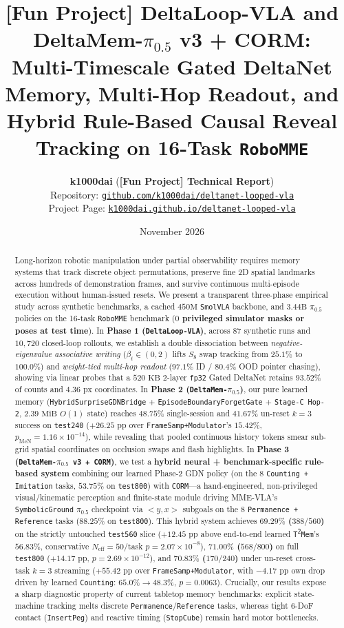 \documentclass[10pt]{article}
\title{\textbf{[Fun Project] DeltaLoop-VLA and DeltaMem-$\pi_{0.5}$ v3 + CORM:\\Multi-Timescale Gated DeltaNet Memory, Multi-Hop Readout, and Hybrid Rule-Based Causal Reveal Tracking on 16-Task \texttt{RoboMME}}}
\author{
  \textbf{k1000dai} \quad (\textbf{[Fun Project] Technical Report}) \\[0.2em]
  \small Repository: \href{https://github.com/k1000dai/deltanet-looped-vla}{\texttt{github.com/k1000dai/deltanet-looped-vla}} \\
  \small Project Page: \href{https://k1000dai.github.io/deltanet-looped-vla/}{\texttt{k1000dai.github.io/deltanet-looped-vla}}
}
\date{November 2026}
\begin{document}
\maketitle

\begin{abstract}
Long-horizon robotic manipulation under partial observability requires memory systems that track discrete object permutations, preserve fine 2D spatial landmarks across hundreds of demonstration frames, and survive continuous multi-episode execution without human-issued resets. We present a transparent three-phase empirical study across synthetic benchmarks, a cached $450\text{M}$ \texttt{SmolVLA} backbone, and $3.44\text{B}$ $\pi_{0.5}$ policies on the 16-task \texttt{RoboMME} benchmark (\textbf{$0$ privileged simulator masks or poses at test time}).
In \textbf{Phase 1 (\texttt{DeltaLoop-VLA})}, across $87$ synthetic runs and $10{,}720$ closed-loop rollouts, we establish a double dissociation between \emph{negative-eigenvalue associative writing} ($\beta_t \in (0, 2)$ lifts $S_8$ swap tracking from $25.1\%$ to $100.0\%$) and \emph{weight-tied multi-hop readout} ($97.1\%$ ID / $80.4\%$ OOD pointer chasing), showing via linear probes that a $520\text{ KB}$ 2-layer \texttt{fp32} Gated DeltaNet retains $93.52\%$ of counts and $4.36\text{ px}$ coordinates.
In \textbf{Phase 2 (\texttt{DeltaMem-$\pi_{0.5}$})}, our pure learned memory (\texttt{Hybrid\allowbreak Surprise\allowbreak GDNBridge} + \texttt{Episode\allowbreak Boundary\allowbreak ForgetGate} + \texttt{Stage-C Hop-2}, $2.39\text{ MiB}$ $O(1)$ state) reaches $48.75\%$ single-session and $41.67\%$ un-reset $k=3$ success on \texttt{test240} ($+26.25\text{ pp}$ over \texttt{FrameSamp+Modulator}'s $15.42\%$, $p_{\mathrm{McN}} = 1.16 \times 10^{-14}$), while revealing that pooled continuous history tokens smear sub-grid spatial coordinates on occlusion swaps and flash highlights.
In \textbf{Phase 3 (\texttt{DeltaMem-$\pi_{0.5}$ v3 + CORM})}, we test a \textbf{hybrid neural + benchmark-specific rule-based system} combining our learned Phase-2 GDN policy (on the $8$ \texttt{Counting + Imitation} tasks, $53.75\%$ on \texttt{test800}) with \texttt{CORM}---a hand-engineered, non-privileged visual/kinematic perception and finite-state module driving MME-VLA's \texttt{SymbolicGround} $\pi_{0.5}$ checkpoint via $<\!y,x\!>$ subgoals on the $8$ \texttt{Permanence + Reference} tasks ($88.25\%$ on \texttt{test800}). This hybrid system achieves \textbf{$69.29\%$ ($388/560$)} on the strictly untouched \texttt{test560} slice ($+12.45\text{ pp}$ above end-to-end learned \texttt{T\textsuperscript{2}Mem}'s $56.83\%$, conservative $N_{\mathrm{eff}}=50$/task $p = 2.07 \times 10^{-8}$), \textbf{$71.00\%$ ($568/800$)} on full \texttt{test800} ($+14.17\text{ pp}$, $p = 2.69 \times 10^{-12}$), and \textbf{$70.83\%$ ($170/240$)} under un-reset cross-task $k=3$ streaming ($+55.42\text{ pp}$ over \texttt{FrameSamp+Modulator}, with $-4.17\text{ pp}$ own drop driven by learned \texttt{Counting}: $65.0\% \to 48.3\%$, $p=0.0063$). Crucially, our results expose a sharp diagnostic property of current tabletop memory benchmarks: explicit state-machine tracking melts discrete \texttt{Permanence}/\texttt{Reference} tasks, whereas tight 6-DoF contact (\texttt{InsertPeg}) and reactive timing (\texttt{StopCube}) remain hard motor bottlenecks.

\end{abstract}
\end{document}
